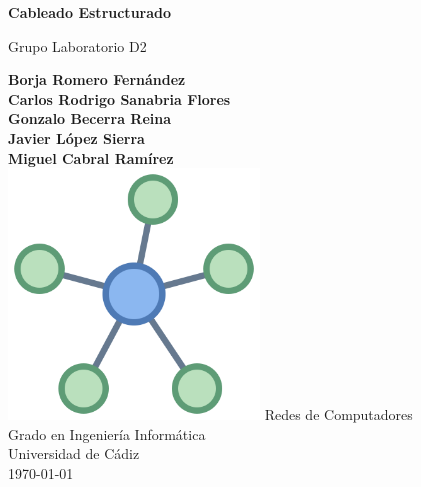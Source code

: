 \begin{titlepage}
   \begin{center}
       \vspace*{1cm}
 
       \textbf{Cableado Estructurado}
 
       \vspace{0.5cm}
        Grupo Laboratorio D2
 
       \vspace{1.5cm}
 
       \textbf{Borja Romero Fernández\\
            Carlos Rodrigo Sanabria Flores\\
            Gonzalo Becerra Reina\\
            Javier López Sierra\\
            Miguel Cabral Ramírez\\}
       \vspace{5cm}
       \includegraphics[width=0.5\textwidth]{redes.png}
       \vfill
       Redes de Computadores\\
       Grado en Ingeniería Informática\\
       Universidad de Cádiz\\
       \today
 
   \end{center}
\end{titlepage}